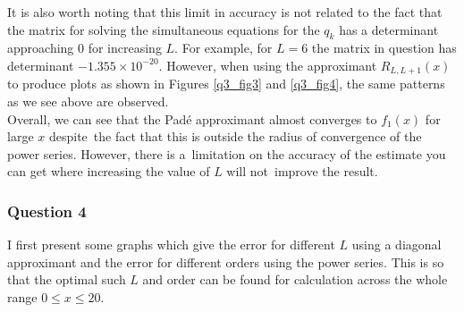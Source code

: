 \documentclass[12pt, a4paper]{article}
\begin{document}
It is also worth noting that this limit in accuracy is not related to the fact that the matrix
for solving the simultaneous equations for the $q_{k}$ has a determinant approaching 0 for
increasing $L$. For example, for $L = 6$ the matrix in question has determinant 
$-1.355\times 10^{-20}$. However, when using the approximant $R_{L,L+1}(x)$ to  
produce plots as shown in Figures \ref{q3_fig3} and \ref{q3_fig4}, the same patterns
as we see above are observed.
\\

Overall, we can see that the Pad\'e approximant almost converges to $f_{1}(x)$ for large $x$ despite\ 
the fact that this is outside the radius of convergence of the power series. However, there is a\ 
limitation on the accuracy of the estimate you can get where increasing the value of $L$ will not\ 
improve the result.

\newpage

\subsubsection*{Question 4}

I first present some graphs which give the error for different $L$ using a diagonal approximant and
the error for different orders using the power series. This is so that the optimal such $L$ and order
can be found for calculation across the whole range $0 \leq x \leq 20$.
\end{document}

